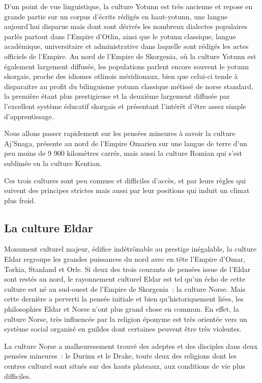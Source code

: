 \documentclass[french, a4paper, 12pt]{article}
\begin{document}
		D'un point de vue linguistique, la culture Yotunn est très ancienne et repose en grande partie sur un corpus d'écrits rédigés en haut-yotunn, une langue aujourd'hui disparue mais dont sont dérivés les nombreux dialectes populaires parlés partout dans l'Empire d'Otlin, ainsi que le yotunn classique, langue académique, universitaire et administrative dans laquelle sont rédigés les actes officiels de l'Empire.
		Au nord de l'Empire de Skorgenia, où la culture Yotunn est également largement diffusée, les populations parlent encore souvent le yotunn skorgais, proche des idiomes otlinois méridionaux, bien que celui-ci tende à disparaitre au profit du bilinguisme yotunn classique métissé de norse standard, la première étant plus prestigieuse et la deuxième largement diffusée par l'excellent système éducatif skorgais et présentant l'intérêt d'être assez simple d'apprentissage.

		Nous allons passer rapidement sur les pensées mineures à savoir la culture Aj'Snaga, présente au nord de l'Empire Omarien sur une langue de terre d'un peu moins de 9 900 kilomètres carrés, mais aussi la culture Romian qui s'est sublimée en la culture Kentian.

		Ces trois cultures sont peu connues et difficiles d'accès, et par leurs règles qui suivent des principes strictes mais aussi par leur positions qui induit un climat plus froid.

	\subsection{La culture Eldar}

		Monument culturel majeur, édifice indétrônable au prestige inégalable, la culture Eldar regroupe les grandes puissances du nord avec en tête l'Empire d'Omar, Torkia, Stanland et Orle. Si deux des trois courants de pensées issue de l'Eldar sont restés au nord, le rayonnement culturel Eldar est tel qu'un écho de cette culture est né au sud-ouest de l'Empire de Skorgenia~: la culture Norse. Mais cette dernière a perverti la pensée initiale et bien qu'historiquement liées, les philosophies Eldar et Norse n'ont plus grand chose en commun. En effet, la culture Norse, très influencée par la religion éponyme est très orientée vers un système social organisé en guildes dont certaines peuvent être très violentes.

		La culture Norse a malheuresement trouvé des adeptes et des disciples dans deux pensées mineures~: le Durinn et le Drake, toute deux des religions dont les centres culturel sont situés sur des hauts plateaux, aux conditions de vie plus difficiles.
\end{document}
